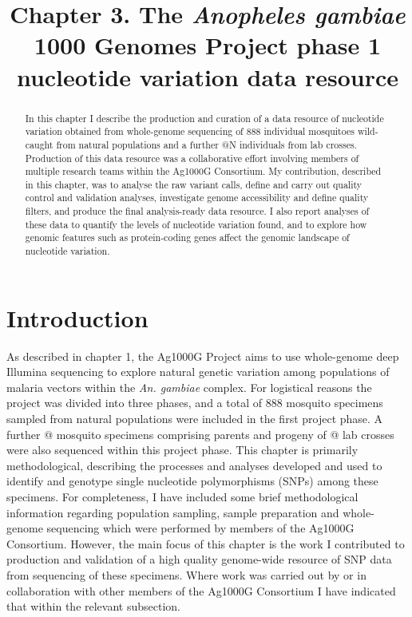 \documentclass[a4paper,11pt,abstracton,hidelinks]{scrartcl}
\title{
Chapter 3. The \textit{Anopheles gambiae} 1000 Genomes Project phase 1 nucleotide variation data resource
}
\author{}
\begin{document}
\renewcommand{\abstractname}{Summary}


\maketitle



\begin{abstract}


In this chapter I describe the production and curation of a data resource of nucleotide variation obtained from whole-genome sequencing of 888 individual mosquitoes wild-caught from natural populations and a further @N individuals from lab crosses.
%
Production of this data resource was a collaborative effort involving members of multiple research teams within the Ag1000G Consortium.
%
My contribution, described in this chapter, was to analyse the raw variant calls, define and carry out quality control and validation analyses, investigate genome accessibility and define quality filters, and produce the final analysis-ready data resource.
%
I also report analyses of these data to quantify the levels of nucleotide variation found, and to explore how genomic features such as protein-coding genes affect the genomic landscape of nucleotide variation.


\end{abstract}


\tableofcontents


\section{Introduction}


As described in chapter 1, the Ag1000G Project aims to use whole-genome deep Illumina sequencing to explore natural genetic variation among populations of malaria vectors within the \textit{An. gambiae} complex.
%
For logistical reasons the project was divided into three phases, and a total of 888 mosquito specimens sampled from natural populations were included in the first project phase.
%
A further @ mosquito specimens comprising parents and progeny of @ lab crosses were also sequenced within this project phase.
%
This chapter is primarily methodological, describing the processes and analyses developed and used to identify and genotype single nucleotide polymorphisms (SNPs) among these specimens.
%
For completeness, I have included some brief methodological information regarding population sampling, sample preparation and whole-genome sequencing which were performed by members of the Ag1000G Consortium.
%
However, the main focus of this chapter is the work I contributed to production and validation of a high quality genome-wide resource of SNP data from sequencing of these specimens.
%
Where work was carried out by or in collaboration with other members of the Ag1000G Consortium I have indicated that within the relevant subsection.
\end{document}

